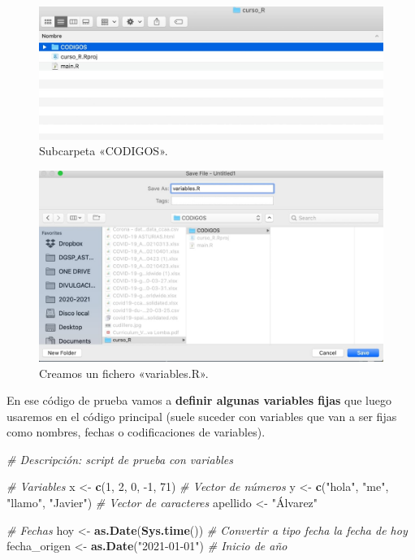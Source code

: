 \documentclass[11pt,]{book}
\newenvironment{Shaded}{\begin{snugshade}}{\end{snugshade}}
\newcommand{\CommentTok}[1]{\textcolor[rgb]{0.37,0.37,0.37}{\textit{#1}}}
\newcommand{\DecValTok}[1]{\textcolor[rgb]{0.06,0.06,0.06}{#1}}
\newcommand{\KeywordTok}[1]{\textcolor[rgb]{0.27,0.27,0.27}{\textbf{#1}}}
\newcommand{\NormalTok}[1]{#1}
\newcommand{\StringTok}[1]{\textcolor[rgb]{0.5,0.5,0.5}{#1}}
\begin{document}
\begin{figure}

{\centering \includegraphics[width=0.5\linewidth]{./img/carpeta_codigos} 

}

\caption{Subcarpeta «CODIGOS».}\label{fig:carpeta-codigos}
\end{figure}

\begin{figure}

{\centering \includegraphics[width=0.5\linewidth]{./img/carpeta_codigos1} 

}

\caption{Creamos un fichero «variables.R».}\label{fig:carpeta-codigos1}
\end{figure}

En ese código de prueba vamos a \textbf{definir algunas variables fijas} que luego usaremos en el código principal (suele suceder con variables que van a ser fijas como nombres, fechas o codificaciones de variables).

\begin{Shaded}
\begin{Highlighting}[]
\CommentTok{# Descripción: script de prueba con variables}

\CommentTok{# Variables}
\NormalTok{x <-}\StringTok{ }\KeywordTok{c}\NormalTok{(}\DecValTok{1}\NormalTok{, }\DecValTok{2}\NormalTok{, }\DecValTok{0}\NormalTok{, }\DecValTok{-1}\NormalTok{, }\DecValTok{71}\NormalTok{) }\CommentTok{# Vector de números}
\NormalTok{y <-}\StringTok{ }\KeywordTok{c}\NormalTok{(}\StringTok{"hola"}\NormalTok{, }\StringTok{"me"}\NormalTok{, }\StringTok{"llamo"}\NormalTok{, }\StringTok{"Javier"}\NormalTok{) }\CommentTok{# Vector de caracteres}
\NormalTok{apellido <-}\StringTok{ "Álvarez"}

\CommentTok{# Fechas}
\NormalTok{hoy <-}\StringTok{ }\KeywordTok{as.Date}\NormalTok{(}\KeywordTok{Sys.time}\NormalTok{()) }\CommentTok{# Convertir a tipo fecha la fecha de hoy}
\NormalTok{fecha_origen <-}\StringTok{ }\KeywordTok{as.Date}\NormalTok{(}\StringTok{"2021-01-01"}\NormalTok{) }\CommentTok{# Inicio de año}
\end{Highlighting}
\end{Shaded}
\end{document}
